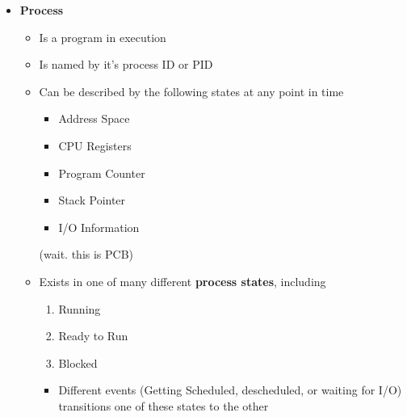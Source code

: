 \documentclass[12pt]{article}
\begin{document}
\begin{enumerate}[1.]
\begin{itemize}
\begin{itemize}
\begin{itemize}
                \begin{itemize}
                    \item Are handled by the operating system directly
                    \item Thread management is done by the kernel
                    \item Are slower than user-level threads
                \end{itemize}
            \end{itemize}
        \end{itemize}

        \item \textbf{Process}

        \begin{itemize}
            \item Is a program in execution
            \item Is named by it's process ID or PID
            \item Can be described by the following states at any point in time

            \begin{itemize}
                \item Address Space
                \item CPU Registers
                \item Program Counter
                \item Stack Pointer
                \item I/O Information
            \end{itemize}

            (wait. this is PCB)

            \item Exists in one of many different \textbf{process states}, including

            \begin{enumerate}[1.]
                \item Running
                \item Ready to Run
                \item Blocked
            \end{enumerate}

            \bigskip

            \begin{itemize}
                \item Different events (Getting Scheduled, descheduled, or waiting for I/O)
                transitions one of these states to the other
            \end{itemize}


\end{itemize}
\end{itemize}
\end{enumerate}
\end{document}

